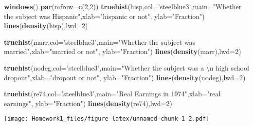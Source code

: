 \documentclass[]{article}
\newenvironment{Shaded}{\begin{snugshade}}{\end{snugshade}}
\newcommand{\KeywordTok}[1]{\textcolor[rgb]{0.13,0.29,0.53}{\textbf{#1}}}
\newcommand{\DataTypeTok}[1]{\textcolor[rgb]{0.13,0.29,0.53}{#1}}
\newcommand{\DecValTok}[1]{\textcolor[rgb]{0.00,0.00,0.81}{#1}}
\newcommand{\CharTok}[1]{\textcolor[rgb]{0.31,0.60,0.02}{#1}}
\newcommand{\StringTok}[1]{\textcolor[rgb]{0.31,0.60,0.02}{#1}}
\newcommand{\NormalTok}[1]{#1}
\begin{document}
\begin{Shaded}
\begin{Highlighting}[]
\KeywordTok{windows}\NormalTok{()}
\KeywordTok{par}\NormalTok{(}\DataTypeTok{mfrow=}\KeywordTok{c}\NormalTok{(}\DecValTok{2}\NormalTok{,}\DecValTok{2}\NormalTok{))}
\KeywordTok{truehist}\NormalTok{(hisp,}\DataTypeTok{col=}\StringTok{'steelblue3'}\NormalTok{,}\DataTypeTok{main=}\StringTok{"Whether the subject was Hispanic"}\NormalTok{,}\DataTypeTok{xlab=}\StringTok{"hispanic or not"}\NormalTok{, }\DataTypeTok{ylab=}\StringTok{"Fraction"}\NormalTok{)}
\KeywordTok{lines}\NormalTok{(}\KeywordTok{density}\NormalTok{(hisp),}\DataTypeTok{lwd=}\DecValTok{2}\NormalTok{)}

\KeywordTok{truehist}\NormalTok{(marr,}\DataTypeTok{col=}\StringTok{'steelblue3'}\NormalTok{,}\DataTypeTok{main=}\StringTok{"Whether the subject was married"}\NormalTok{,}\DataTypeTok{xlab=}\StringTok{"married or not"}\NormalTok{, }\DataTypeTok{ylab=}\StringTok{"Fraction"}\NormalTok{)}
\KeywordTok{lines}\NormalTok{(}\KeywordTok{density}\NormalTok{(marr),}\DataTypeTok{lwd=}\DecValTok{2}\NormalTok{)}

\KeywordTok{truehist}\NormalTok{(nodeg,}\DataTypeTok{col=}\StringTok{'steelblue3'}\NormalTok{,}\DataTypeTok{main=}\StringTok{"Whether the subject was a }\CharTok{\textbackslash{}n}\StringTok{ high school dropout"}\NormalTok{,}\DataTypeTok{xlab=}\StringTok{"dropout or not"}\NormalTok{, }\DataTypeTok{ylab=}\StringTok{"Fraction"}\NormalTok{)}
\KeywordTok{lines}\NormalTok{(}\KeywordTok{density}\NormalTok{(nodeg),}\DataTypeTok{lwd=}\DecValTok{2}\NormalTok{)}

\KeywordTok{truehist}\NormalTok{(re74,}\DataTypeTok{col=}\StringTok{'steelblue3'}\NormalTok{,}\DataTypeTok{main=}\StringTok{"Real Earnings in 1974"}\NormalTok{,}\DataTypeTok{xlab=}\StringTok{"real earnings"}\NormalTok{, }\DataTypeTok{ylab=}\StringTok{"Fraction"}\NormalTok{)}
\KeywordTok{lines}\NormalTok{(}\KeywordTok{density}\NormalTok{(re74),}\DataTypeTok{lwd=}\DecValTok{2}\NormalTok{)}
\end{Highlighting}
\end{Shaded}

\texttt{[image: Homework1\_files/figure-latex/unnamed-chunk-1-2.pdf]}
\end{document}
